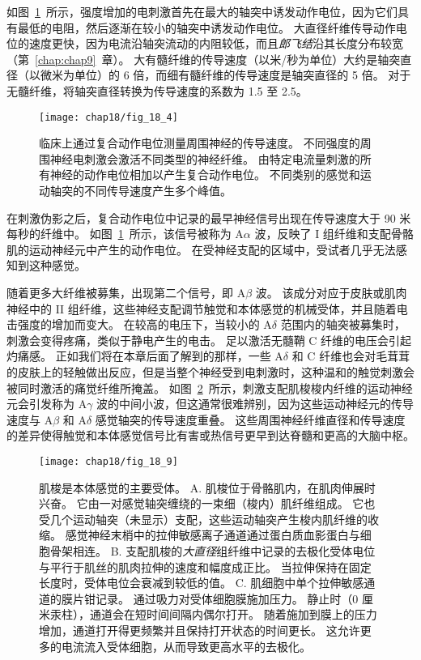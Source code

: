 如图~\ref{fig:18_4}~所示，强度增加的电刺激首先在最大的轴突中诱发动作电位，因为它们具有最低的电阻，然后逐渐在较小的轴突中诱发动作电位。
大直径纤维传导动作电位的速度更快，因为电流沿轴突流动的内阻较低，而且\textit{郎飞结}沿其长度分布较宽（第~\ref{chap:chap9}~章）。
大有髓纤维的传导速度（以米/秒为单位）大约是轴突直径（以微米为单位）的 6 倍，而细有髓纤维的传导速度是轴突直径的 5 倍。
对于无髓纤维，将轴突直径转换为传导速度的系数为 1.5 至 2.5。


\begin{figure}[htbp]
	\centering
	\texttt{[image: chap18/fig\_18\_4]}
	\caption{临床上通过复合动作电位测量周围神经的传导速度。
		不同强度的周围神经电刺激会激活不同类型的神经纤维。
		由特定电流量刺激的所有神经的动作电位相加以产生复合动作电位。
		不同类别的感觉和运动轴突的不同传导速度产生多个峰值\cite{erlanger2016electrical}。}
	\label{fig:18_4}
\end{figure}


在刺激伪影之后，复合动作电位中记录的最早神经信号出现在传导速度大于 90 米每秒的纤维中。
如图~\ref{fig:18_4}~所示，该信号被称为 A$\alpha$ 波，反映了 I 组纤维和支配骨骼肌的运动神经元中产生的动作电位。
在受神经支配的区域中，受试者几乎无法感知到这种感觉。


随着更多大纤维被募集，出现第二个信号，即 A$\beta$ 波。
该成分对应于皮肤或肌肉神经中的 II 组纤维，这些神经支配调节触觉和本体感觉的机械受体，并且随着电击强度的增加而变大。
在较高的电压下，当较小的 A$\delta$ 范围内的轴突被募集时，刺激会变得疼痛，类似于静电产生的电击。
足以激活无髓鞘 C 纤维的电压会引起灼痛感。
正如我们将在本章后面了解到的那样，一些 A$\delta$ 和 C 纤维也会对毛茸茸的皮肤上的轻触做出反应，但是当整个神经受到电刺激时，这种温和的触觉刺激会被同时激活的痛觉纤维所掩盖。
如图~\ref{fig:18_9}~所示，刺激支配肌梭梭内纤维的运动神经元会引发称为 A$\gamma$ 波的中间小波，但这通常很难辨别，因为这些运动神经元的传导速度与 A$\beta$ 和 A$\delta$ 感觉轴突的传导速度重叠。
这些周围神经纤维直径和传导速度的差异使得触觉和本体感觉信号比有害或热信号更早到达脊髓和更高的大脑中枢。


\begin{figure}[htbp]
	\centering
	\texttt{[image: chap18/fig\_18\_9]}
	\caption{肌梭是本体感觉的主要受体。
		A. 肌梭位于骨骼肌内，在肌肉伸展时兴奋。
		它由一对感觉轴突缠绕的一束细（梭内）肌纤维组成。
		它也受几个运动轴突（未显示）支配，这些运动轴突产生梭内肌纤维的收缩。
		感觉神经末梢中的拉伸敏感离子通道通过蛋白质血影蛋白与细胞骨架相连\cite{sachs1992stretch}。
		B. 支配肌梭的\textit{大直径}组纤维中记录的去极化受体电位与平行于肌丝的肌肉拉伸的速度和幅度成正比。 
		当拉伸保持在固定长度时，受体电位会衰减到较低的值\cite{cone1971transducer}。
		C. 肌细胞中单个拉伸敏感通道的膜片钳记录。
		通过吸力对受体细胞膜施加压力。
		静止时（0 厘米汞柱），通道会在短时间间隔内偶尔打开。 
		随着施加到膜上的压力增加，通道打开得更频繁并且保持打开状态的时间更长。
		这允许更多的电流流入受体细胞，从而导致更高水平的去极化\cite{guharay1984stretch}。}
	\label{fig:18_9}
\end{figure}



